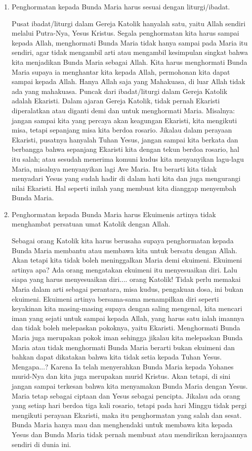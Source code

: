 \begin{enumerate}
\item Penghormatan kepada Bunda Maria harus sesuai dengan liturgi/ibadat.

Pusat ibadat/liturgi dalam Gereja Katolik hanyalah satu, yaitu Allah sendiri melalui Putra-Nya, Yesus Kristus. Segala penghormatan kita harus sampai kepada Allah, menghormati Bunda Maria tidak hanya sampai pada Maria itu sendiri, agar tidak mengambil arti atau mengambil kesimpulan singkat bahwa kita menjadikan Bunda Maria sebagai Allah. Kita harus menghormati Bunda Maria supaya ia menghantar kita kepada Allah, permohonan kita dapat sampai kepada Allah. Hanya Allah saja yang Mahakuasa, di luar Allah tidak ada yang mahakuasa. Puncak dari ibadat/liturgi dalam Gereja Katolik adalah Ekaristi. Dalam ajaran Gereja Katolik, tidak pernah Ekaristi diperalatkan atau diganti demi dan untuk menghormati Maria. Misalnya: jangan sampai kita yang percaya akan keagungan Ekaristi, kita mengikuti misa, tetapi sepanjang misa kita berdoa rosario. Jikalau dalam perayaan Ekaristi, pusatnya hanyalah Tuhan Yesus, jangan sampai kita berkata dan berbangga bahwa sepanjang Ekaristi kita dengan tekun berdoa rosario, hal itu salah; atau sesudah menerima komuni kudus kita menyanyikan lagu-lagu Maria, misalnya menyanyikan lagi Ave Maria. Itu berarti kita tidak menyadari Yesus yang sudah hadir di dalam hati kita dan juga mengurangi nilai Ekaristi. Hal seperti inilah yang membuat kita dianggap menyembah Bunda Maria.

\item Penghormatan kepada Bunda Maria harus Ekuimenis artinya tidak menghambat persatuan umat Katolik dengan Allah.

Sebagai orang Katolik kita harus berusaha supaya penghormatan kepada Bunda Maria membantu atau membawa kita untuk bersatu dengan Allah. Akan tetapi kita tidak boleh meninggalkan Maria demi ekuimeni. Ekuimeni artinya apa? Ada orang mengatakan ekuimeni itu menyesuaikan diri. Lalu siapa yang harus menyesuaikan diri.... orang Katolik! Tidak perlu memakai Maria dalam arti sebagai perantara, misa kudus, pengakuan dosa, ini bukan ekuimeni. Ekuimeni artinya bersama-sama menampilkan diri seperti keyakinan kita masing-masing supaya dengan saling mengenal, kita mencari iman yang sejati untuk sampai kepada Allah, yang harus satu ialah imannya dan tidak boleh melepaskan pokoknya, yaitu Ekaristi. Menghormati Bunda Maria juga merupakan pokok iman sehingga jikalau kita melepaskan Bunda Maria atau tidak menghormati Bunda Maria berarti bukan ekuimeni dan bahkan dapat dikatakan bahwa kita tidak setia kepada Tuhan Yesus. Mengapa...? Karena Ia telah menyerahkan Bunda Maria kepada Yohanes murid-Nya dan kita juga merupakan murid Kristus. Akan tetapi, di sini jangan sampai terkesan bahwa kita menyamakan Bunda Maria dengan Yesus. Maria tetap sebagai ciptaan dan Yesus sebagai pencipta. Jikalau ada orang yang setiap hari berdoa tiga kali rosario, tetapi pada hari Minggu tidak pergi mengikuti perayaan Ekaristi, maka itu penghormatan yang salah dan sesat. Bunda Maria hanya mau dan menghendaki untuk membawa kita kepada Yesus dan Bunda Maria tidak pernah membuat atau mendirikan kerajaannya sendiri di dunia ini.


\end{enumerate}
